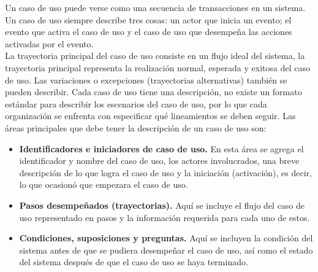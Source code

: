 Un caso de uso puede verse como una secuencia de transacciones en un sistema. Un caso de uso siempre describe tres cosas: un actor que inicia un evento; 
el evento que activa el caso de uso y el caso de uso que desempeña las acciones activadas
por el evento.\\

La trayectoria principal del caso de uso consiste en un flujo ideal del sistema, la trayectoria principal representa la realización normal, esperada y exitosa del caso de uso. Las variaciones o excepciones (trayectorias alternativas) también 
se pueden describir. Cada caso de uso tiene una descripción, no existe un formato estándar para describir los escenarios del caso de uso, por lo que cada organización se enfrenta con especificar qué lineamientos se deben seguir. Las áreas principales 
que debe tener la descripción de un caso de uso son:
\begin{itemize}
 \item {\bf Identificadores e iniciadores de caso de uso.} En esta área se agrega el identificador y nombre del caso de uso, los actores involucrados, una breve descripción de lo que logra el caso de uso y la iniciación (activación), es decir, lo que ocasionó que empezara el caso de uso.
 \item {\bf Pasos desempeñados (trayectorias).} Aquí se incluye el flujo del caso de uso representado en pasos y la información requerida para cada uno de estos.
 \item {\bf Condiciones, suposiciones y preguntas.} Aquí se incluyen la condición del sistema antes de que se pudiera desempeñar el caso de uso, así como el estado del sistema después de que el caso de uso se haya terminado.
\end{itemize}

